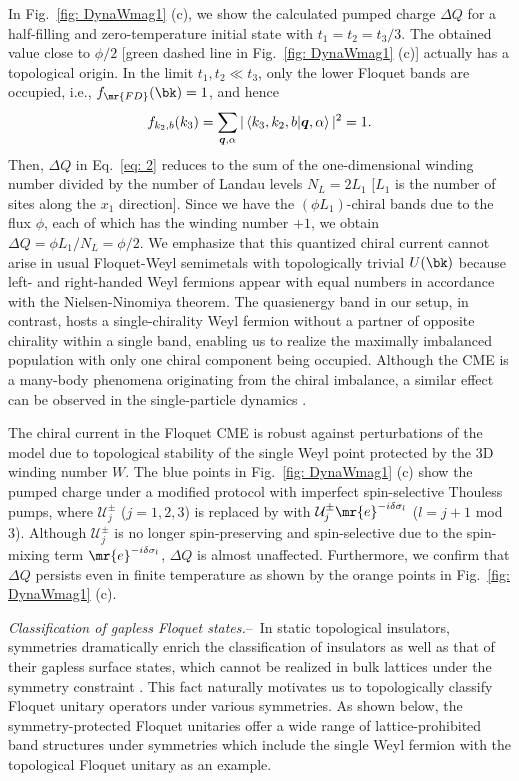 \documentclass[
floatfix,
pra,
twocolumn,
reprint,
amsmath,amssymb,
aps,
footnote,
]{revtex4}
\begin{document}
In Fig.~\ref{fig: DynaWmag1} (c), we show the calculated pumped charge $\Delta Q$ for a half-filling and zero-temperature initial state with $t_1 = t_2 = t_3/3$.
The obtained value close to $\phi/2$ [green dashed line in Fig.~\ref{fig: DynaWmag1} (c)] actually has a topological origin.
In the limit $t_1, t_2\ll t_3$, only the lower Floquet bands are occupied, i.e., $f_{\mr{FD}}(\bk) = 1$, and hence
\begin{align}
	f_{k_2, b}(k_3) =
	\sum_{\bm{q}, \alpha}
	|\braket{k_3, k_2, b|\bm{q}, \alpha}|^2
	= 1
	.
\end{align}
Then, $\Delta Q$ in Eq.~\eqref{eq: 2} reduces to the sum of the one-dimensional winding number divided by the number of Landau levels $N_L = 2L_1$ [$L_1$ is the number of sites along the $x_1$ direction].
Since we have the $(\phi L_1)$-chiral bands due to the flux $\phi$, each of which has the winding number $+1$, we obtain $\Delta Q = \phi L_1 /N_L = \phi / 2$.
We emphasize that this quantized chiral current cannot arise in usual Floquet-Weyl semimetals with topologically trivial $U(\bk)$ because left- and right-handed Weyl fermions appear with equal numbers in accordance with the Nielsen-Ninomiya theorem.
The quasienergy band in our setup, in contrast, hosts a single-chirality Weyl fermion without a partner of opposite chirality within a single band, enabling us to realize the maximally imbalanced population with only one chiral component being occupied.
Although the CME is a many-body phenomena originating from the chiral imbalance, a similar effect can be observed in the single-particle dynamics \cite{single_particle}.

The chiral current in the Floquet CME is robust against perturbations of the model due to topological stability of the single Weyl point protected by the 3D winding number $W$.
The blue points in Fig.~\ref{fig: DynaWmag1} (c) show the pumped charge under a modified protocol with imperfect spin-selective Thouless pumps, where $\mathcal{U}_j^\pm$ ($j=1,2,3$) is replaced by with $\mathcal{U}_j^\pm \mr{e}^{-i \delta \sigma_l}$ ($l=j+1$ mod 3).
Although $\mathcal{U}_j^\pm$ is no longer spin-preserving and spin-selective due to the spin-mixing term $\mr{e}^{-i \delta \sigma_l}$, $\Delta Q$ is almost unaffected.
Furthermore, we confirm that $\Delta Q$ persists even in finite temperature as shown by the orange points in Fig.~\ref{fig: DynaWmag1} (c).



\textit{Classification of gapless Floquet states.}--\
In static topological insulators, symmetries dramatically enrich the classification of insulators as well as that of their gapless surface states, which cannot be realized in bulk lattices under the symmetry constraint \cite{QiZhang11}.
This fact naturally motivates us to topologically classify Floquet unitary operators under various symmetries.
As shown below, the symmetry-protected Floquet unitaries offer a wide range of lattice-prohibited band structures under symmetries which include the single Weyl fermion with the topological Floquet unitary as an example.
\end{document}
